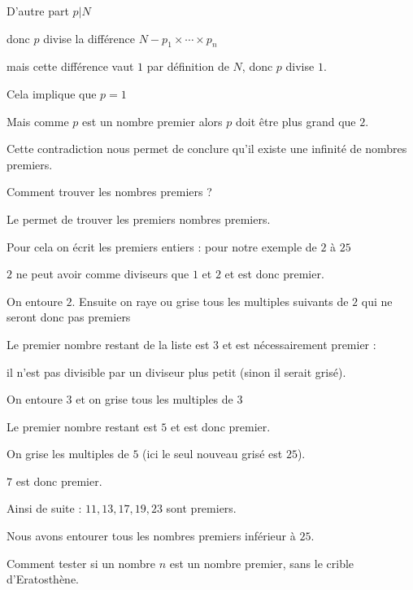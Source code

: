 \change 

D'autre part $p|N$ 


donc $p$ divise la différence $N-p_1\times \cdots \times p_n$

mais cette différence vaut $1$ par définition de $N$, donc $p$ divise $1$.

\change

Cela implique que $p=1$

\change

Mais comme $p$ est un nombre premier alors $p$ doit être plus grand que $2$.

Cette contradiction nous permet de conclure qu'il existe une infinité de nombres premiers.



\diapo

Comment trouver les nombres premiers ? 

Le  permet de trouver les premiers nombres premiers.

Pour cela on écrit les premiers entiers : pour notre exemple de $2$ à $25$

\change

$2$ ne peut avoir comme diviseurs que $1$ et $2$ et est donc premier.

On entoure $2$. Ensuite on raye ou grise tous les multiples suivants de $2$ qui ne seront donc pas premiers


\change

Le premier nombre restant de la liste est $3$ et est nécessairement premier : 

il n'est pas divisible par un diviseur
plus petit (sinon il serait grisé). 

On entoure $3$ et on grise tous les multiples de $3$

\change

Le premier nombre restant est $5$ et est donc premier. 

On grise les multiples de $5$ (ici le seul nouveau grisé est $25$).

\change 

$7$ est donc premier.

Ainsi de suite : $11, 13, 17, 19, 23$ sont premiers.

Nous avons entourer tous les nombres premiers inférieur à $25$.

\change

Comment tester si un nombre $n$ est un nombre premier, sans le crible d'Eratosthène.

